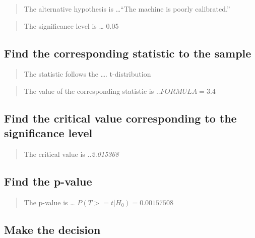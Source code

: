\documentclass[
]{article}
\begin{document}
\begin{quote}
The alternative hypothesis is \ldots{}``The machine is poorly
calibrated.''
\end{quote}

\begin{quote}
The significance level is \ldots{} 0.05
\end{quote}

\begin{quote}
\end{quote}

\hypertarget{find-the-corresponding-statistic-to-the-sample}{%
\subsection{Find the corresponding statistic to the
sample}\label{find-the-corresponding-statistic-to-the-sample}}

\begin{quote}
The statistic follows the \ldots. t-distribution
\end{quote}

\begin{quote}
The value of the corresponding statistic is ..\emph{\(FORMULA = 3.4\)}
\end{quote}

\hypertarget{find-the-critical-value-corresponding-to-the-significance-level}{%
\subsection{Find the critical value corresponding to the significance
level}\label{find-the-critical-value-corresponding-to-the-significance-level}}

\begin{quote}
The critical value is ..\emph{2.015368}
\end{quote}

\hypertarget{find-the-p-value}{%
\subsection{Find the p-value}\label{find-the-p-value}}

\begin{quote}
The p-value is \ldots{} \emph{\(P(T >= t | H_0) = 0.00157508\)}
\end{quote}

\hypertarget{make-the-decision}{%
\subsection{Make the decision}\label{make-the-decision}}
\end{document}
